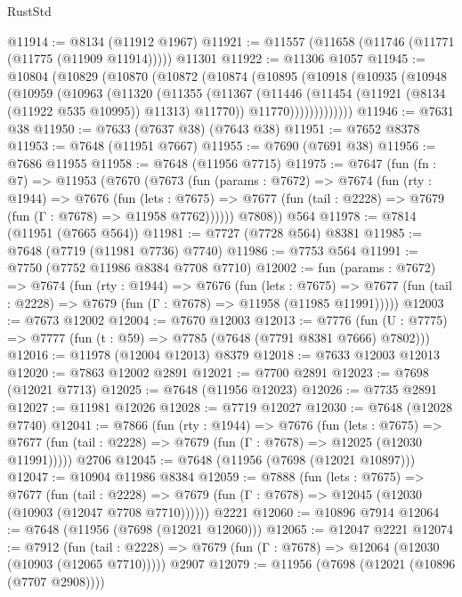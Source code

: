\begin{lexlean}{RustStd}
\begin{coremodule}
{\begin{coremodule}
{{{{{{{{{{{{{{{{{{{{{{{{{{{{{{{{{{{{{{{{{{{{{{{{{{{{{@11914 := @8134 (@11912 @1967)
@11921 := @11557 (@11658 (@11746 (@11771 (@11775 (@11909 @11914))))) @11301
@11922 := @11306 @1057
@11945 := @10804
    (@10829
      (@10870
        (@10872
          (@10874
            (@10895
              (@10918
                (@10935
                  (@10948
                    (@10959
                      (@10963
                        (@11320
                          (@11355
                            (@11367
                              (@11446 (@11454 (@11921 (@8134 (@11922 @535 @10995)) @11313) @11770))
                              @11770)))))))))))))
@11946 := @7631 @38
@11950 := @7633 (@7637 @38) (@7643 @38)
@11951 := @7652 @8378
@11953 := @7648 (@11951 @7667)
@11955 := @7690 (@7691 @38)
@11956 := @7686 @11955
@11958 := @7648 (@11956 @7715)
@11975 := @7647
    (fun (fn : @7) =>
    @11953
      (@7670
        (@7673
          (fun (params : @7672) =>
          @7674
            (fun (rty : @1944) =>
            @7676
              (fun (lets : @7675) =>
              @7677 (fun (tail : @2228) => @7679 (fun (Γ : @7678) => @11958 @7762))))))
        @7808))
    @564
@11978 := @7814 (@11951 (@7665 @564))
@11981 := @7727 (@7728 @564) @8381
@11985 := @7648 (@7719 (@11981 @7736) @7740)
@11986 := @7753 @564
@11991 := @7750 (@7752 @11986 @8384 @7708 @7710)
@12002 := fun (params : @7672) =>
  @7674
    (fun (rty : @1944) =>
    @7676
      (fun (lets : @7675) =>
      @7677 (fun (tail : @2228) => @7679 (fun (Γ : @7678) => @11958 (@11985 @11991)))))
@12003 := @7673 @12002
@12004 := @7670 @12003
@12013 := @7776
    (fun (U : @7775) => @7777 (fun (t : @59) => @7785 (@7648 (@7791 @8381 @7666) @7802)))
@12016 := @11978 (@12004 @12013) @8379
@12018 := @7633 @12003 @12013
@12020 := @7863 @12002 @2891
@12021 := @7700 @2891
@12023 := @7698 (@12021 @7713)
@12025 := @7648 (@11956 @12023)
@12026 := @7735 @2891
@12027 := @11981 @12026
@12028 := @7719 @12027
@12030 := @7648 (@12028 @7740)
@12041 := @7866
    (fun (rty : @1944) =>
    @7676
      (fun (lets : @7675) =>
      @7677 (fun (tail : @2228) => @7679 (fun (Γ : @7678) => @12025 (@12030 @11991)))))
    @2706
@12045 := @7648 (@11956 (@7698 (@12021 @10897)))
@12047 := @10904 @11986 @8384
@12059 := @7888
    (fun (lets : @7675) =>
    @7677
      (fun (tail : @2228) =>
      @7679 (fun (Γ : @7678) => @12045 (@12030 (@10903 (@12047 @7708 @7710))))))
    @2221
@12060 := @10896 @7914
@12064 := @7648 (@11956 (@7698 (@12021 @12060)))
@12065 := @12047 @2221
@12074 := @7912
    (fun (tail : @2228) => @7679 (fun (Γ : @7678) => @12064 (@12030 (@10903 (@12065 @7710)))))
    @2907
@12079 := @11956 (@7698 (@12021 (@10896 (@7707 @2908))))
}}}}}}}}}}}}}}}}}}}}}}}}}}}}}}}}}}}}}}}}}}}}}}}}}}}}}
\end{coremodule}}
\end{coremodule}
\end{lexlean}
